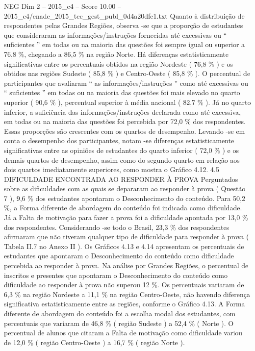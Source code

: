 \begin{textsample}{NEG Dim 2 – 2015\_c4 – Score 10.00 – 2015\_c4/enade\_2015\_tec\_gest\_publ\_0d4a20dfe1.txt}
Quanto à distribuição de respondentes pelas Grandes Regiões, observa -se que a proporção de estudantes que consideraram as informações/instruções fornecidas até excessivas ou “ suficientes ” em todas ou na maioria das questões foi sempre igual ou superior a 76,8 \%, chegando a 86,5 \% na região Norte.
Há diferenças estatisticamente significativas entre os percentuais obtidos na região Nordeste ( 76,8 \% ) e os obtidos nas regiões Sudeste ( 85,8 \% ) e Centro-Oeste ( 85,8 \% ).
O percentual de participantes que avaliaram “ as informações/instruções ” como até excessivas ou “ suficientes ” em todas ou na maioria das questões foi mais elevado no quarto superior ( 90,6 \% ), percentual superior à média nacional ( 82,7 \% ).
Já no quarto inferior, a suficiência das informações/instruções declarada como até excessiva, em todas ou na maioria das questões foi percebida por 72,0 \% dos respondentes.
Essas proporções são crescentes com os quartos de desempenho.
Levando -se em conta o desempenho dos participantes, notam -se diferenças estatisticamente significativas entre as opiniões de estudantes do quarto inferior ( 72,0 \% ) e os demais quartos de desempenho, assim como do segundo quarto em relação aos dois quartos imediatamente superiores, como mostra o Gráfico 4.12. 4.5 DIFICULDADE ENCONTRADA AO RESPONDER À PROVA Perguntados sobre as dificuldades com as quais se depararam ao responder à prova ( Questão 7 ), 9,6 \% dos estudantes apontaram o Desconhecimento do conteúdo.
Para 50,2 \%, a Forma diferente de abordagem do conteúdo foi indicada como dificuldade.
Já a Falta de motivação para fazer a prova foi a dificuldade apontada por 13,0 \% dos respondentes.
Considerando -se todo o Brasil, 23,3 \% dos respondentes afirmaram que não tiveram qualquer tipo de dificuldade para responder à prova ( Tabela II.7 no Anexo II ).
Os Gráficos 4.13 e 4.14 apresentam os percentuais de estudantes que apontaram o Desconhecimento do conteúdo como dificuldade percebida ao responder à prova.
Na análise por Grandes Regiões, o percentual de inscritos e presentes que apontaram o Desconhecimento do conteúdo como dificuldade ao responder à prova não superou 12 \%.
Os percentuais variaram de 6,3 \% na região Nordeste a 11,1 \% na região Centro-Oeste, não havendo diferença significativa estatisticamente entre as regiões, conforme o Gráfico 4.13.
A Forma diferente de abordagem do conteúdo foi a escolha modal dos estudantes, com percentuais que variaram de 46,8 \% ( região Sudeste ) a 52,4 \% ( Norte ).
O percentual de alunos que citaram a Falta de motivação como dificuldade variou de 12,0 \% ( região Centro-Oeste ) a 16,7 \% ( região Norte ).

\end{textsample}
